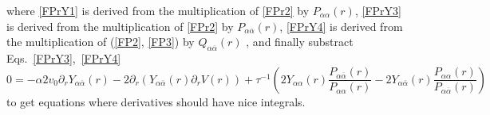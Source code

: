 \documentclass[pre,aps,superscriptaddress,nofootinbib]{revtex4}
\begin{document}
where \eqref{FPrY1} is derived from the multiplication of \eqref{FPr2} by $P_{\alpha\alpha}(r)$,
\eqref{FPrY3} is derived from the multiplication of \eqref{FPr2} by $P_{\alpha\overline{\alpha}}(r)$, \eqref{FPrY4} is derived from the multiplication of (\ref{FP2}, \ref{FP3}) by $Q_{\alpha\overline{\alpha}}(r)$
, and finally substract
%
Eqs.~\ref{FPrY3},~\ref{FPrY4}
\begin{equation}
0 = - \alpha 2 v_0 \partial_r Y_{\alpha\overline{\alpha}}(r) - 2 \partial_r (Y_{\alpha\overline{\alpha}}(r) \partial_r V(r)) + \tau^{-1} \left(2 Y_{\alpha\alpha}(r) \frac{P_{\alpha\overline{\alpha}}(r)}{P_{\alpha\alpha}(r)} - 2 Y_{\alpha\overline{\alpha}}(r) \frac{P_{\alpha\alpha}(r)}{P_{\alpha\overline{\alpha}}(r)}\right)
\end{equation}
to get equations where derivatives should have nice integrals.\\
\end{document}
